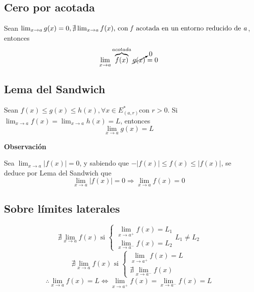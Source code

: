 \documentclass[11pt,titlepage]{article}
\newcommand{\commLim}[2]{\lim_{#1 \to #2}}
\newcommand{\littleTitle}[1]{
	\noindent \ignorespaces
	\small \textbf{#1} \normalsize
	\ignorespaces \ignorespacesafterend
}
\begin{document}
\subsection{Cero por acotada}
Sean $\lim_{x \to a} g(x) = 0, \nexists \lim_{x \to a} f(x) \text{, con \textit{f} acotada en un entorno reducido de \textit{a}}$,\\
entonces
\begin{equation}\label{ceroacotada}
		\lim_{x \to a} \overbrace{f(x)}^{acotada} \cancelto{0}{g(x)} = 0
\end{equation}

\subsection{Lema del Sandwich}
Sean $f(x) \leq g(x) \leq h(x), \forall x \in E^{\ast}_{(a,r)} \text{con } r>0.$
Si $\lim_{x \to a} f(x) = \lim_{x \to a} h(x) = L$, entonces
\begin{equation}\label{sandwich}
	\lim_{x \to a} g(x) = L
\end{equation}

\littleTitle{Observación}\par
Sea $\lim_{x \to a} |f(x)| = 0$, y sabiendo que $-|f(x)| \leq f(x) \leq |f(x)|$, se deduce por Lema del Sandwich que
\begin{equation}
	\lim_{x \to a} |f(x)| = 0 \Rightarrow \lim_{x \to a} f(x) = 0
\end{equation}

\subsection{Sobre límites laterales}
\begin{equation*}
	\nexists \lim_{x \to a} f(x) \text{ si }
	\begin{cases}
		\lim_{x \to a^{+}} f(x) = L_1 \\
		\lim_{x \to a^{-}} f(x) = L_2
	\end{cases}
	L_1 \neq L_2
\end{equation*}
\begin{equation*}
	\nexists \lim_{x \to a} f(x) \text{ si }
	\begin{cases}
		\commLim{x}{a^{+}} f(x) = L \\
		\nexists \commLim{x}{a^{-}} f(x)
	\end{cases}
\end{equation*}
\vspace{0.5cm}
\begin{equation}
	\therefore \commLim{x}{a} f(x) = L \Leftrightarrow \commLim{x}{a^{+}} f(x) = \commLim{x}{a^{-}} f(x) = L
\end{equation}
\end{document}
